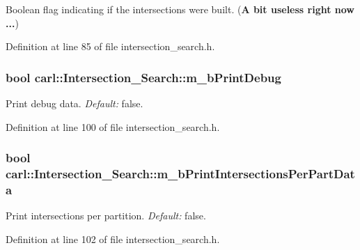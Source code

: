 Boolean flag indicating if the intersections were built. ({\bfseries A bit useless right now ...}) 



Definition at line 85 of file intersection\+\_\+search.\+h.

\hypertarget{classcarl_1_1_intersection___search_af69485e014f8178ec6c6dcbd95bf9dc9}{}
\subsubsection[{m\+\_\+b\+Print\+Debug}]{\setlength{\rightskip}{0pt plus 5cm}bool carl\+::\+Intersection\+\_\+\+Search\+::m\+\_\+b\+Print\+Debug\hspace{0.3cm}{\ttfamily [protected]}}\label{classcarl_1_1_intersection___search_af69485e014f8178ec6c6dcbd95bf9dc9}


Print debug data. {\itshape Default\+:} false. 



Definition at line 100 of file intersection\+\_\+search.\+h.

\hypertarget{classcarl_1_1_intersection___search_a32e74e1f2aaaf5630b57091d01e5932b}{}
\subsubsection[{m\+\_\+b\+Print\+Intersections\+Per\+Part\+Data}]{\setlength{\rightskip}{0pt plus 5cm}bool carl\+::\+Intersection\+\_\+\+Search\+::m\+\_\+b\+Print\+Intersections\+Per\+Part\+Data\hspace{0.3cm}{\ttfamily [protected]}}\label{classcarl_1_1_intersection___search_a32e74e1f2aaaf5630b57091d01e5932b}


Print intersections per partition. {\itshape Default\+:} false. 



Definition at line 102 of file intersection\+\_\+search.\+h.

